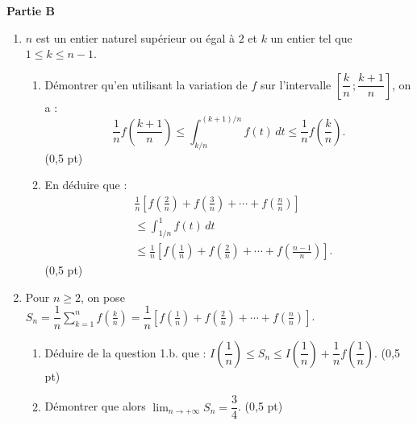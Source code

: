 \medskip
\noindent\textbf{Partie B}

\begin{enumerate}
	\item $n$ est un entier naturel supérieur ou égal à $2$ et $k$ un entier tel que $1 \leqslant k \leqslant n-1$.
	\begin{enumerate}
		\item Démontrer qu'en utilisant la variation de $f$ sur l'intervalle $\left[\dfrac{k}{n}\,;\dfrac{k+1}{n}\right]$, on a :
		$$
		\frac{1}{n}f\!\left(\frac{k+1}{n}\right) \leqslant \int_{k/n}^{(k+1)/n} f(t)\,dt \leqslant \frac{1}{n}f\!\left(\frac{k}{n}\right).
		$$
		\hfill (0,5 pt)
		\item En déduire que :
		$$
		\begin{aligned}
			&\frac{1}{n}\left[f\!\left(\frac{2}{n}\right)+f\!\left(\frac{3}{n}\right)+\cdots+f\!\left(\frac{n}{n}\right)\right] \\
			&\leqslant \int_{1/n}^{1} f(t)\,dt \\
			&\leqslant \frac{1}{n}\left[f\!\left(\frac{1}{n}\right)+f\!\left(\frac{2}{n}\right)+\cdots+f\!\left(\frac{n-1}{n}\right)\right].
		\end{aligned}
		$$
		\hfill (0,5 pt)
	\end{enumerate}
	\item Pour $n \geqslant 2$, on pose $S_n = \dfrac{1}{n}\displaystyle\sum_{k=1}^n f\!\left(\frac{k}{n}\right) = \dfrac{1}{n}\left[f\!\left(\frac{1}{n}\right)+f\!\left(\frac{2}{n}\right)+\cdots+f\!\left(\frac{n}{n}\right)\right]$.
	\begin{enumerate}
		\item Déduire de la question 1.b. que : $I\!\left(\dfrac{1}{n}\right) \leqslant S_n \leqslant I\!\left(\dfrac{1}{n}\right) + \dfrac{1}{n}f\!\left(\dfrac{1}{n}\right)$. \hfill (0,5 pt)
		\item Démontrer que alors $\displaystyle\lim_{n\to+\infty} S_n = \dfrac{3}{4}$. \hfill (0,5 pt)
	\end{enumerate}
\end{enumerate}
